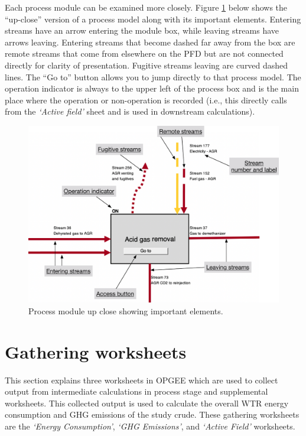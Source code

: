 \documentclass[11pt]{report}
\newcommand{\sheet}[1]{\textit{`{#1}'}}
\begin{document}
Each process module can be examined more closely. Figure \ref{fig:Process_mod_diagram} below shows the ``up-close'' version of a process model along with its important elements. Entering streams have an arrow entering the module box, while leaving streams have arrows leaving. Entering streams that become dashed far away from the box are remote streams that come from elsewhere on the PFD but are not connected directly for clarity of presentation. Fugitive streams leaving are curved dashed lines. The ``Go to'' button allows you to jump directly to that process model. The operation indicator is always to the upper left of the process box and is the main place where the operation or non-operation is recorded (i.e., this directly calls from the \sheet{Active field} sheet and is used in downstream calculations). 

\begin{figure}[t]
\includegraphics[width=1\columnwidth]{images/Process_mod_diagram.pdf}
\caption{Process module up close showing important elements.}
\label{fig:Process_mod_diagram}
\end{figure}



\chapter{Gathering worksheets}

This section explains three worksheets in OPGEE which are used to collect output from intermediate calculations in process stage and supplemental worksheets. This collected output is used to calculate the overall WTR energy consumption and GHG emissions of the study crude. These gathering worksheets are the \sheet{Energy Consumption}, \sheet{GHG Emissions}, and \sheet{Active Field} worksheets. 
\end{document}
